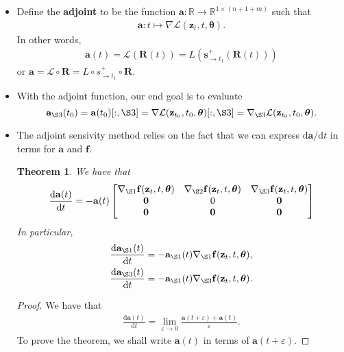 \documentclass[10pt]{article}
\newtheorem{theorem}[lemma]{Theorem}
\newcommand{\dee}{\mathrm{d}}
\newcommand{\ve}[1]{\mathbf{#1}}
\newcommand{\ves}[1]{\boldsymbol{#1}}
\newcommand{\mcal}[1]{\mathcal{#1}}
\newcommand{\Real}{\mathbb{R}}
\begin{document}
\begin{itemize}
  \item Define the {\bf adjoint} to be the function $\ve{a}: \Real \rightarrow \Real^{1 \times (n+1+m)}$ such that
  \begin{align*}
    \ve{a}: t \mapsto \nabla \mcal{L}(\ve{z}_t, t, \ves{\theta}).
  \end{align*}
  In other words,
  \begin{align*}
    \ve{a}(t) = \mcal{L}(\ve{R}(t)) = L(\ve{s}^+_{\rightarrow t_1}(\ve{R}(t)))
  \end{align*}
  or $\ve{a} = \mcal{L} \circ \ve{R} = L \circ s_{\rightarrow t_1}^+ \circ \ve{R}$.

  \item With the adjoint function, our end goal is to evaluate $$\ve{a}_{\S3}(t_0) 
  = \ve{a}(t_0)[:,\S3] 
  = \nabla \mcal{L}(\ve{z}_{t_0}, t_0, \ves{\theta})[:, \S3] 
  = \nabla_{\S3}\mcal{L}(\ve{z}_{t_0}, t_0, \ves{\theta}).$$

  \item The adjoint sensivity method relies on the fact that we can express $\dee\ve{a} / \dee t$ in terms for $\ve{a}$ and $\ve{f}$.
  \begin{theorem}
  We have that
  \begin{align*}
    \frac{\dee \ve{a}(t)}{\dee t}
    = -\ve{a}(t)
    \begin{bmatrix}
      \nabla_{\S1}\ve{f}(\ve{z}_t, t, \ves{\theta})
      & \nabla_{\S2}\ve{f}(\ve{z}_t, t, \ves{\theta})
      & \nabla_{\S3}\ve{f}(\ve{z}_t, t, \ves{\theta}) \\
      \ve{0} & 0 & \ve{0} \\
      \ve{0} & \ve{0} & \ve{0}
    \end{bmatrix}
  \end{align*}
  In particular,
  \begin{align*}
    \frac{ \dee \ve{a}_{\S 1}(t)}{\dee t} &= -\ve{a}_{\S1}(t) \nabla_{\S1}\ve{f}(\ve{z}_t, t, \ves{\theta}), \\
    \frac{ \dee \ve{a}_{\S 3}(t)}{\dee t} &= -\ve{a}_{\S1}(t) \nabla_{\S3}\ve{f}(\ve{z}_t, t, \ves{\theta}). \\
  \end{align*}
  \end{theorem}

  \begin{proof}
    We have that 
    \begin{align*}
      \frac{\dee \ve{a}(t)}{\dee t} = \lim_{\varepsilon \rightarrow 0} \frac{\ve{a}(t + \varepsilon) + \ve{a}(t)}{\varepsilon}.
    \end{align*}
    To prove the theorem, we shall write $\ve{a}(t)$ in terms of $\ve{a}(t+\varepsilon)$.


\end{proof}
\end{itemize}
\end{document}
